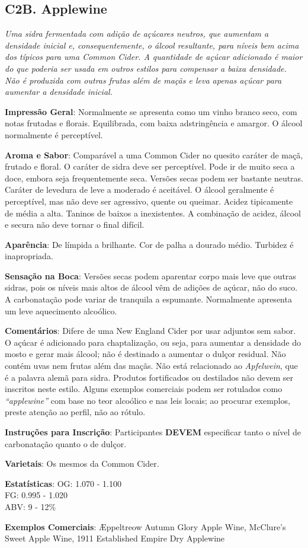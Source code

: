 \subsection*{C2B. Applewine}

\textit{Uma sidra fermentada com adição de açúcares neutros, que aumentam a densidade inicial e, consequentemente, o álcool resultante, para níveis bem acima dos típicos para uma Common Cider. A quantidade de açúcar adicionado é maior do que poderia ser usada em outros estilos para compensar a baixa densidade. Não é produzida com outras frutas além de maçãs e leva apenas açúcar para aumentar a densidade inicial.}

\textbf{Impressão Geral}: Normalmente se apresenta como um vinho branco seco, com notas frutadas e florais. Equilibrada, com baixa adstringência e amargor. O álcool normalmente é perceptível.

\textbf{Aroma e Sabor}: Comparável a uma Common Cider no quesito caráter de maçã, frutado e floral. O caráter de sidra deve ser perceptível. Pode ir de muito seca a doce, embora seja frequentemente seca. Versões secas podem ser bastante neutras. Caráter de levedura de leve a moderado é aceitável. O álcool geralmente é perceptível, mas não deve ser agressivo, quente ou queimar. Acidez tipicamente de média a alta. Taninos de baixos a inexistentes. A combinação de acidez, álcool e secura não deve tornar o final difícil.

\textbf{Aparência}: De límpida a brilhante. Cor de palha a dourado médio. Turbidez é inapropriada.

\textbf{Sensação na Boca}: Versões secas podem aparentar corpo mais leve que outras sidras, pois os níveis mais altos de álcool vêm de adições de açúcar, não do suco. A carbonatação pode variar de tranquila a espumante. Normalmente apresenta um leve aquecimento alcoólico.

\textbf{Comentários}: Difere de uma New England Cider por usar adjuntos sem sabor. O açúcar é adicionado para chaptalização, ou seja, para aumentar a densidade do mosto e gerar mais álcool; não é destinado a aumentar o dulçor residual. Não contém uvas nem frutas além das maçãs. Não está relacionado ao \textit{Apfelwein}, que é a palavra alemã para sidra. Produtos fortificados ou destilados não devem ser inscritos neste estilo. Alguns exemplos comerciais podem ser rotulados como \textit{“applewine”} com base no teor alcoólico e nas leis locais; ao procurar exemplos, preste atenção ao perfil, não ao rótulo.

\textbf{Instruções para Inscrição}: Participantes \textbf{DEVEM} especificar tanto o nível de carbonatação quanto o de dulçor.

\textbf{Varietais}: Os mesmos da Common Cider.

\textbf{Estatísticas}: OG: 1.070 - 1.100 \\
\phantom{ } \hspace{16.5mm} FG: 0.995 - 1.020 \\
\phantom{ } \hspace{16.5mm} ABV: 9 - 12\%

\textbf{Exemplos Comerciais}: Æppeltreow Autumn Glory Apple Wine, McClure’s Sweet Apple Wine, 1911 Established Empire Dry Applewine
